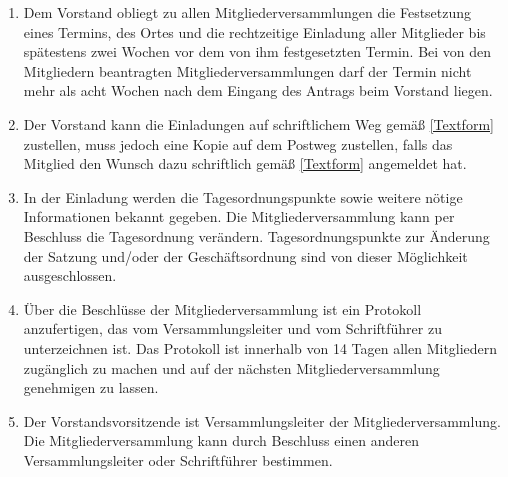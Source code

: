\documentclass[fontsize=12pt,paper=a4,pagesize,headings=small]{scrartcl}
\begin{document}
\begin{enumerate}
    \item Dem Vorstand obliegt zu allen Mitgliederversammlungen die
    Festsetzung eines Termins, des Ortes und die rechtzeitige Einladung
    aller Mitglieder bis spätestens zwei Wochen vor dem von ihm
    festgesetzten Termin. Bei von den Mitgliedern beantragten
    Mitgliederversammlungen darf der Termin nicht mehr als acht Wochen
    nach dem Eingang des Antrags beim Vorstand liegen.

    \item Der Vorstand kann die Einladungen auf schriftlichem Weg gemäß
    \ref{Textform} zustellen, muss jedoch eine Kopie auf dem
    Postweg zustellen, falls das Mitglied den Wunsch dazu schriftlich
    gemäß \ref{Textform} angemeldet hat.

    \item In der Einladung werden die Tagesordnungspunkte sowie weitere
    nötige Informationen bekannt gegeben. Die Mitgliederversammlung
    kann per Beschluss die Tagesordnung verändern. Tagesordnungspunkte
    zur Änderung der Satzung und/oder der Geschäftsordnung sind von
    dieser Möglichkeit ausgeschlossen.

    \item Über die Beschlüsse der Mitgliederversammlung ist ein
    Protokoll anzufertigen, das vom Versammlungsleiter und vom
    Schriftführer zu unterzeichnen ist. Das Protokoll ist innerhalb von
    14 Tagen allen Mitgliedern zugänglich zu machen und auf der
    nächsten Mitgliederversammlung genehmigen zu lassen.

    \item Der Vorstandsvorsitzende ist Versammlungsleiter der
    Mitgliederversammlung. Die Mitgliederversammlung kann durch
    Beschluss einen anderen Versammlungsleiter oder Schriftführer
    bestimmen.
\end{enumerate}
\end{document}

